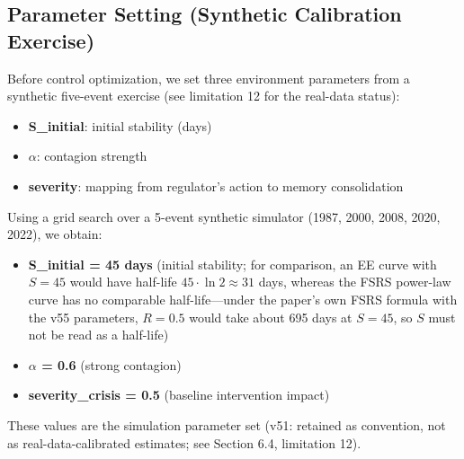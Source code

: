 \documentclass[11pt]{article}
\begin{document}
\subsection{Parameter Setting (Synthetic Calibration Exercise)}
Before control optimization, we set three environment parameters from a synthetic five-event exercise (see limitation 12 for the real-data status):

\begin{itemize}
\item \textbf{S\_initial}: initial stability (days)
\item \textbf{$\alpha$}: contagion strength
\item \textbf{severity}: mapping from regulator's action to memory consolidation
\end{itemize}

Using a grid search over a 5-event synthetic simulator (1987, 2000, 2008, 2020, 2022), we obtain:

\begin{itemize}
\item \textbf{S\_initial = 45 days} (initial stability; for comparison, an EE curve with $S=45$ would have half-life $45 \cdot \ln 2 \approx 31$ days, whereas the FSRS power-law curve has no comparable half-life---under the paper's own FSRS formula with the v55 parameters, $R=0.5$ would take about 695 days at $S=45$, so $S$ must not be read as a half-life)
\item \textbf{$\alpha$ = 0.6} (strong contagion)
\item \textbf{severity\_crisis = 0.5} (baseline intervention impact)
\end{itemize}

These values are the simulation parameter set (v51: retained as convention, not as real-data-calibrated estimates; see Section 6.4, limitation 12).
\end{document}
